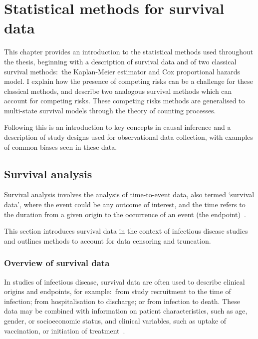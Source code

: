 
\chapter{Statistical methods for survival data}\label{cha:methods}

\graphicspath{{01_Introduction/Figs/}}

This chapter provides an introduction to the statistical methods used throughout the thesis, beginning with a description of survival data and of two classical survival methods:\ the Kaplan-Meier estimator and Cox proportional hazards model. I explain how the presence of competing risks can be a challenge for these classical methods, and describe two analogous survival methods which can account for competing risks. These competing risks methods are generalised to multi-state survival models through the theory of counting processes.

Following this is an introduction to key concepts in causal inference and a description of study designs used for observational data collection, with examples of common biases seen in these data.

\section{Survival analysis}

Survival analysis involves the analysis of time-to-event data, also termed `survival data', where the event could be any outcome of interest, and the time refers to the duration from a given origin to the occurrence of an event (the endpoint)~\parencite{Collett2023-bg}.

This section introduces survival data in the context of infectious disease studies and outlines methods to account for data censoring and truncation.

\subsection{Overview of survival data}

In studies of infectious disease, survival data are often used to describe clinical origins and endpoints, for example:\ from study recruitment to the time of infection; from hospitalisation to discharge; or from infection to death. These data may be combined with information on patient characteristics, such as age, gender, or socioeconomic status, and clinical variables, such as uptake of vaccination, or initiation of treatment~\parencite{Collett2023-bg}.

